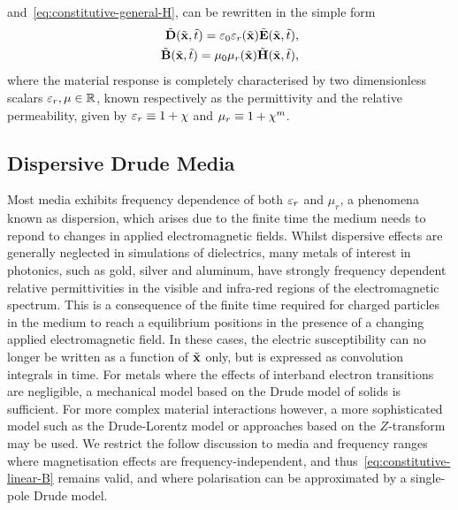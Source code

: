 and~\eqref{eq:constitutive-general-H}, can be rewritten in the simple form
\begin{subequations}
  \label{eq:constitutive-linear}
  \begin{align}
    \tilde{\mathbf{D}}(\tilde{\mathbf{x}},\tilde{t}) = \varepsilon_0 \varepsilon_r(\tilde{\mathbf{x}}) \tilde{\mathbf{E}}(\tilde{\mathbf{x}},\tilde{t}), \label{eq:constitutive-linear-D} \\
    \tilde{\mathbf{B}}(\tilde{\mathbf{x}},\tilde{t}) = \mu_0 \mu_r(\tilde{\mathbf{x}}) \tilde{\mathbf{H}}(\tilde{\mathbf{x}},\tilde{t}),\label{eq:constitutive-linear-B}
  \end{align}
\end{subequations}
where the material response is completely characterised by two dimensionless
scalars $ \varepsilon_r, \mu \in \mathbb{R}$, known respectively as the permittivity and the
relative permeability, given by $\varepsilon_r \equiv 1 + \chi $ and $\mu_r
\equiv 1 + \chi^{m} $.

\subsection{Dispersive Drude Media}
Most media exhibits frequency dependence of both $\varepsilon_r$ and $\mu_r$, a
phenomena known as dispersion, which arises due to the finite time the medium
needs to repond to changes in applied electromagnetic fields. Whilst dispersive
effects are generally neglected in simulations of dielectrics, many metals of
interest in photonics, such as gold, silver and aluminum, have strongly
frequency dependent relative permittivities in the visible and infra-red regions
of the electromagnetic spectrum\cite{Ordal:1983bg}. This is a consequence of the
finite time required for charged particles in the medium to reach a equilibrium
positions in the presence of a changing applied electromagnetic field. In these
cases, the electric susceptibility can no longer be written as a function of
$\tilde{\mathbf{x}}$ only, but is expressed as convolution integrals in
time\cite{Jackson:490457}.
For metals where the effects of interband electron transitions are negligible, a
mechanical model based on the Drude model of solids is
sufficient\cite{taflove2013advances}. For more complex material interactions
however, a more sophisticated model such as the Drude-Lorentz
model\cite{Fox:2001wm,Taflove:1989ds} or approaches based on the
$Z$-transform\cite{sullivan1996z} may be used. We restrict the follow discussion
to media and frequency ranges where magnetisation effects are
frequency-independent, and thus~\eqref{eq:constitutive-linear-B} remains valid,
and where polarisation can be approximated by a single-pole Drude model.

